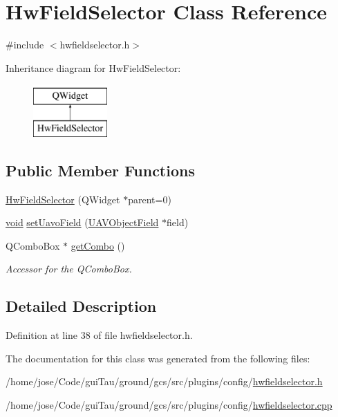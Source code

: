 \hypertarget{class_hw_field_selector}{\section{Hw\-Field\-Selector Class Reference}
\label{class_hw_field_selector}
}


{\ttfamily \#include $<$hwfieldselector.\-h$>$}

Inheritance diagram for Hw\-Field\-Selector\-:\begin{figure}[H]
\begin{center}
\leavevmode
\includegraphics[height=2.000000cm]{class_hw_field_selector}
\end{center}
\end{figure}
\subsection*{Public Member Functions}
\begin{DoxyCompactItemize}
\item 
\hyperlink{group___core_plugin_gaa29673aaa8535fe3be4f2a2d04bc5422}{Hw\-Field\-Selector} (Q\-Widget $\ast$parent=0)
\item 
\hyperlink{group___u_a_v_objects_plugin_ga444cf2ff3f0ecbe028adce838d373f5c}{void} \hyperlink{group___core_plugin_ga068f0e383aeba7a77ae5e4acfa3247b6}{set\-Uavo\-Field} (\hyperlink{class_u_a_v_object_field}{U\-A\-V\-Object\-Field} $\ast$field)
\item 
Q\-Combo\-Box $\ast$ \hyperlink{group___core_plugin_gac6b33d61ddc894413dd9766d721a40f3}{get\-Combo} ()
\begin{DoxyCompactList}\small\item\em Accessor for the Q\-Combo\-Box. \end{DoxyCompactList}\end{DoxyCompactItemize}


\subsection{Detailed Description}


Definition at line 38 of file hwfieldselector.\-h.



The documentation for this class was generated from the following files\-:\begin{DoxyCompactItemize}
\item 
/home/jose/\-Code/gui\-Tau/ground/gcs/src/plugins/config/\hyperlink{hwfieldselector_8h}{hwfieldselector.\-h}\item 
/home/jose/\-Code/gui\-Tau/ground/gcs/src/plugins/config/\hyperlink{hwfieldselector_8cpp}{hwfieldselector.\-cpp}\end{DoxyCompactItemize}
